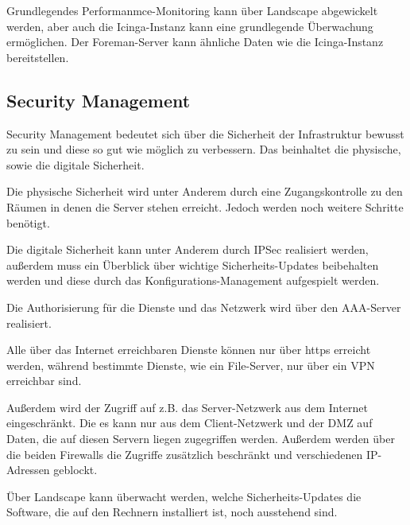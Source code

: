 Grundlegendes Performanmce-Monitoring kann über Landscape abgewickelt werden, aber auch die Icinga-Instanz kann eine grundlegende Überwachung ermöglichen. 
Der Foreman-Server kann ähnliche Daten wie die Icinga-Instanz bereitstellen.

\subsection{Security Management}
Security Management bedeutet sich über die Sicherheit der Infrastruktur bewusst zu sein und diese so gut wie möglich zu verbessern. Das beinhaltet die physische, sowie die digitale Sicherheit.

Die physische Sicherheit wird unter Anderem durch eine Zugangskontrolle zu den Räumen in denen die Server stehen erreicht. Jedoch werden noch weitere Schritte benötigt.

Die digitale Sicherheit kann unter Anderem durch IPSec realisiert werden, außerdem muss ein Überblick über wichtige Sicherheits-Updates beibehalten werden und diese durch das Konfigurations-Management aufgespielt werden.

Die Authorisierung für die Dienste und das Netzwerk wird über den AAA-Server realisiert.

Alle über das Internet erreichbaren Dienste können nur über https erreicht werden, während bestimmte Dienste, wie ein File-Server, nur über ein VPN erreichbar sind.

Außerdem wird der Zugriff auf z.B. das Server-Netzwerk aus dem Internet eingeschränkt. Die es kann nur aus dem Client-Netzwerk und der DMZ auf Daten, die auf diesen Servern liegen zugegriffen werden. Außerdem werden über die beiden Firewalls die Zugriffe zusätzlich beschränkt und verschiedenen IP-Adressen geblockt.

Über Landscape kann überwacht werden, welche Sicherheits-Updates die Software, die auf den Rechnern installiert ist, noch ausstehend sind.
